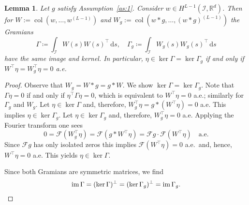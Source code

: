 \documentclass[10pt,a4paper]{amsart}
\newtheorem{lemma}{Lemma}
\newcommand{\R}{\mathbb R}
\DeclareMathOperator{\col}{\operatorname{col}}
\newcommand{\intv}{\mathcal I}
\begin{document}
\begin{lemma}
\label{lem:conv_gram}
    Let $g$ satisfy Assumption~\ref{as:1}. Consider $w\in H^{L-1}(\intv, \R^d)$. Then for $W:=\col(w,\dots,w^{(L-1)})$ and $W_g:=\col(w*g,\dots, (w*g)^{(L-1)})$ the Gramians
    \begin{equation}
        \Gamma \coloneq \int_\intv W(s)W(s)^\top\,\mathrm ds,\quad \Gamma_g \coloneq \int_\intv W_g(s)W_g(s)^\top\,\mathrm ds
    \end{equation}
    have the same image and kernel. In particular, $\eta\in\ker\Gamma = \ker\Gamma_g$ if and only if $W^\top \eta = W_g^\top \eta = 0$ a.e.
\end{lemma}

\begin{proof}
    Observe that $W_g = W*g = g*W$. We show $\ker \Gamma = \ker\Gamma_g$. Note that $\Gamma \eta=0$ if and only if $\eta^\top \Gamma \eta=0$, which is equivalent to $W^\top \eta=0$ a.e.; similarly for $\Gamma_g$ and $W_g$. Let $\eta\in\ker \Gamma$ and, therefore, $W_g^\top \eta = g*(W^\top\eta) =0$ a.e. This implies $\eta\in\ker\Gamma_g$. Let $\eta\in\ker\Gamma_g$ and, therefore, $W_g^\top \eta = 0$ a.e. Applying the Fourier transform one sees $$0=\mathcal F (W_g^\top \eta) = \mathcal F(g*W^\top\eta) =\mathcal F g \cdot \mathcal F (W^\top \eta)\quad \text{a.e.}$$
    Since $\mathcal F g$ has only isolated zeros this implies $\mathcal F (W^\top \eta)=0$ a.e.\ and, hence, $W^\top \eta=0$ a.e. This yields $\eta\in\ker \Gamma$.

    Since both Gramians are symmetric matrices, we find 
    \begin{equation*}
        \operatorname{im}\Gamma = (\ker\Gamma)^\bot = (\ker\Gamma_g)^\bot = \operatorname{im}\Gamma_g.\qedhere
    \end{equation*}
\end{proof}
\end{document}
